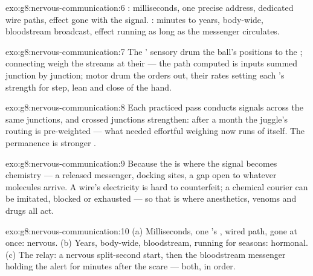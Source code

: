 \begin{solution}{exo:g8:nervous-communication:6}
: milliseconds, one precise address, dedicated wire
paths, effect gone with the signal. : minutes to
years, body-wide, bloodstream broadcast, effect running as
long as the messenger circulates.
\end{solution}

\begin{solution}{exo:g8:nervous-communication:7}
The ' sensory  drum the ball's positions to the
; connecting  weigh the streams at their
 --- the path computed is inputs summed junction
by junction; motor  drum the orders out, their
rates setting each 's strength for step, lean and
close of the hand.
\end{solution}

\begin{solution}{exo:g8:nervous-communication:8}
Each practiced pass conducts signals across the same
junctions, and crossed junctions strengthen: after a month
the juggle's routing is pre-weighted --- what needed
effortful weighing now runs of itself. The permanence is
stronger .
\end{solution}

\begin{solution}{exo:g8:nervous-communication:9}
Because the  is where the signal becomes chemistry
--- a released messenger, docking sites, a gap open to
whatever molecules arrive. A wire's electricity is hard to
counterfeit; a chemical courier can be imitated, blocked
or exhausted --- so that is where anesthetics, venoms and
drugs all act.
\end{solution}

\begin{solution}{exo:g8:nervous-communication:10}
(a) Milliseconds, one 's , wired path, gone at
once: nervous. (b) Years, body-wide, bloodstream, running
for seasons: hormonal. (c) The relay: a nervous
split-second start, then the bloodstream messenger holding
the alert for minutes after the scare --- both, in order.
\end{solution}

